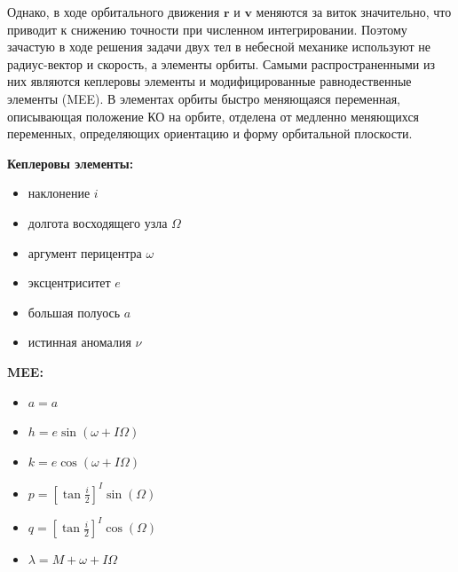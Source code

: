 Однако, в ходе орбитального движения $\mathbf{r}$ и $\mathbf{v}$ меняются за виток значительно, что приводит к снижению точности при численном интегрировании.
Поэтому зачастую в ходе решения задачи двух тел в небесной механике используют не радиус-вектор и скорость, а элементы орбиты.
Самыми распространенными из них являются кеплеровы элементы и модифицированные равнодественные элементы (MEE).
В элементах орбиты быстро меняющаяся переменная, описывающая положение КО на орбите, отделена от медленно меняющихся переменных,
определяющих ориентацию и форму орбитальной плоскости.
\begin{center}
    \begin{minipage}[t]{0.45\textwidth}
        \vspace{0pt}
        \textbf{Кеплеровы элементы:}
        \begin{itemize}
            \item наклонение $i$
            \item долгота восходящего узла $\Omega$
            \item аргумент перицентра $\omega$
            \item эксцентриситет $e$
            \item большая полуось $a$
            \item истинная аномалия $\nu$
        \end{itemize}
    \end{minipage}
    \hspace{1cm}
    \begin{minipage}[t]{0.45\textwidth}
        \vspace{0pt}
        \textbf{MEE:}
        \begin{itemize}
            \item $a = a$
            \item $h = e \sin\left(\omega + I \Omega \right)$
            \item $k = e \cos\left(\omega + I \Omega \right)$
            \item $p = \left[\tan{\frac{i}{2}}\right]^I \sin(\Omega)$
            \item $q = \left[\tan{\frac{i}{2}}\right]^I \cos(\Omega)$
            \item $\lambda = M + \omega + I \Omega$
        \end{itemize}
    \end{minipage}
\end{center}

